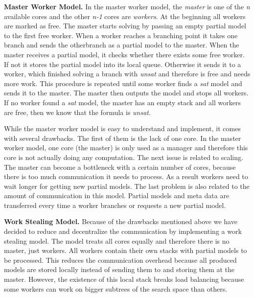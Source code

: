 \documentclass[letterpaper]{article}
\newcommand{\mypar}[1]{{\bf #1.}}
\begin{document}
\mypar{Master Worker Model}
In the master worker model, the \textit{master} is one of the \textit{n} available cores and the other \textit{n-1} cores are \textit{workers}.
At the beginning all workers are marked as free.
The master starts solving by passing an empty partial model to the first free worker.
When a worker reaches a branching point it takes one branch and sends the other\linebreak branch as a partial model to the master.
When the master receives a partial model, it checks whether there exists some free worker.
If not it stores the partial model into its local queue.
Otherwise it sends it to a worker, which finished solving a branch with \textit{unsat} and therefore is free and needs more work.
This procedure is repeated until some worker finds a \textit{sat} model and sends it to the master.
The master then outputs the model and stops all workers.
If no worker found a \textit{sat} model, the master has an empty stack and all workers are free, then we know that the formula is \textit{unsat}.

While the master worker model is easy to understand and implement, it comes with several drawbacks.
The first of them is the lack of one core.
In the master worker model, one core (the master) is only used as a manager and therefore this core is not actually doing any computation.
The next issue is related to scaling.
The master can become a bottleneck with a certain number of cores, because there is too much communication it needs to process.
As a result workers need to wait longer for getting new partial models.
The last problem is also related to the amount of communication in this model.
Partial models and meta data are transferred every time a worker branches or requests a new partial model.

\mypar{Work Stealing Model}
Because of the drawbacks mentioned above we have decided to reduce and decentralize the communication by implementing a work stealing model.
The model treats all cores equally and therefore there is no master, just workers.
All workers contain their own stacks with partial models to be processed.
This reduces the communication overhead because all produced models are stored locally instead of sending them to and storing them at the master.
However, the existence of this local stack breaks load balancing because some workers can work on bigger subtrees of the search space than others.
\end{document}

